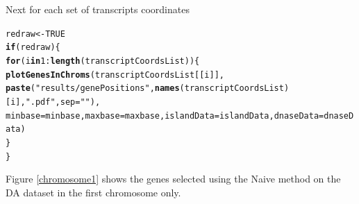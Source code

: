 \documentclass[a4paper,10pt]{article}\usepackage[]{graphicx}\usepackage[]{color}
\makeatletter
\newcommand{\hlnum}[1]{\textcolor[rgb]{0.686,0.059,0.569}{#1}}%
\newcommand{\hlstr}[1]{\textcolor[rgb]{0.192,0.494,0.8}{#1}}%
\newcommand{\hlopt}[1]{\textcolor[rgb]{0,0,0}{#1}}%
\newcommand{\hlstd}[1]{\textcolor[rgb]{0.345,0.345,0.345}{#1}}%
\newcommand{\hlkwa}[1]{\textcolor[rgb]{0.161,0.373,0.58}{\textbf{#1}}}%
\newcommand{\hlkwb}[1]{\textcolor[rgb]{0.69,0.353,0.396}{#1}}%
\newcommand{\hlkwc}[1]{\textcolor[rgb]{0.333,0.667,0.333}{#1}}%
\newcommand{\hlkwd}[1]{\textcolor[rgb]{0.737,0.353,0.396}{\textbf{#1}}}%
\newenvironment{kframe}{%
 \def\at@end@of@kframe{}%
 \ifinner\ifhmode%
  \def\at@end@of@kframe{\end{minipage}}%
  \begin{minipage}{\columnwidth}%
 \fi\fi%
 \def\FrameCommand##1{\hskip\@totalleftmargin \hskip-\fboxsep
 \colorbox{shadecolor}{##1}\hskip-\fboxsep
     \hskip-\linewidth \hskip-\@totalleftmargin \hskip\columnwidth}%
 \MakeFramed {\advance\hsize-\width
   \@totalleftmargin\z@ \linewidth\hsize
   \@setminipage}}%
 {\par\unskip\endMakeFramed%
 \at@end@of@kframe}
\newenvironment{knitrout}{}{} %
\makeatother
\begin{document}
Next for each set of transcripts coordinates 

\begin{knitrout}
\color{fgcolor}\begin{kframe}
\begin{alltt}
\hlstd{redraw} \hlkwb{<-} \hlnum{TRUE}
\hlkwa{if} \hlstd{(redraw)\{}
  \hlkwa{for} \hlstd{(i} \hlkwa{in} \hlnum{1}\hlopt{:}\hlkwd{length}\hlstd{(transcriptCoordsList))\{}
    \hlkwd{plotGenesInChroms} \hlstd{(transcriptCoordsList[[i]],}
                       \hlkwd{paste}\hlstd{(}\hlstr{"results/genePositions"}\hlstd{,} \hlkwd{names}\hlstd{(transcriptCoordsList)[i],}\hlstr{".pdf"}\hlstd{,} \hlkwc{sep}\hlstd{=}\hlstr{""}\hlstd{),}
                       \hlkwc{minbase}\hlstd{=minbase,} \hlkwc{maxbase}\hlstd{=maxbase,} \hlkwc{islandData}\hlstd{=islandData,} \hlkwc{dnaseData}\hlstd{=dnaseData)}
  \hlstd{\}}
\hlstd{\}}
\end{alltt}
\end{kframe}
\end{knitrout}

Figure \ref{chromosome1} shows the genes selected using the Naive method on the DA dataset in the first chromosome only.
\end{document}
